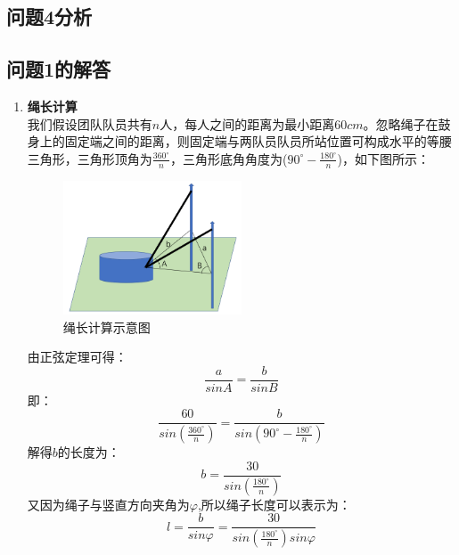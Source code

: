 \documentclass{cumcm}
\begin{document}
\subsection{问题4分析}


\subsection{问题1的解答}
\begin{enumerate}
\item \textbf{绳长计算}\\
我们假设团队队员共有$n$人，每人之间的距离为最小距离$60cm$。忽略绳子在鼓身上的固定端之间的距离，则固定端与两队员队员所站位置可构成水平的等腰三角形，三角形顶角为$\frac{360^{\circ}}{n}$，三角形底角角度为($90^{\circ}-\frac{180^{\circ}}{n}$)，如下图所示：
\begin{figure}[H]
\centering
\includegraphics[width=0.5\textwidth]{img/string.png}
\caption{绳长计算示意图}
\end{figure}
由正弦定理可得：
\begin{displaymath}
\frac{a}{sinA}=\frac{b}{sinB}
\end{displaymath}
即：
\begin{displaymath}
\frac{60}{sin({\frac{360^{\circ}}{n}})}=\frac{b}{sin({90^{\circ}-\frac{180^{\circ}}{n}})}
\end{displaymath}
解得$b$的长度为：
\begin{displaymath}
b=\frac{30}{sin( \frac{180^{\circ}}{n})}
\end{displaymath}
又因为绳子与竖直方向夹角为$\varphi$,所以绳子长度可以表示为：
\begin{equation}
l=\frac{b}{sin\varphi}=\frac{30}{sin(\frac{180^{\circ}}{n})sin\varphi}
\end{equation}


\end{enumerate}
\end{document}
